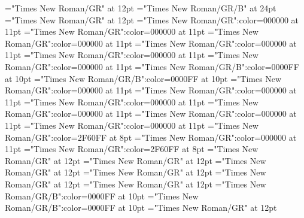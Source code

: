 \documentclass[a4paper]{article}
\begin{document}
\pagestyle{plain}
\sloppy
\setlength{\parfillskip}{0pt plus 1fil}
\font{}="Times New Roman/GR" at 12pt
\font{}="Times New Roman/GR/B" at 24pt
\font{}="Times New Roman/GR" at 12pt
\font\entryletDatadicBody="Times New Roman/GR":color=000000 at 11pt
\font\pictureRightentryletDatadicBody="Times New Roman/GR":color=000000 at 11pt
\font\picturepictureRightentryletDatadicBody="Times New Roman/GR":color=000000 at 11pt
\font\pictureCaptionpictureRightentryletDatadicBody="Times New Roman/GR":color=000000 at 11pt
\font\CmPicturepublishStemCaptionSenseNumberpictureCaptionpictureRightentryletDatadicBody="Times New Roman/GR":color=000000 at 11pt
\font\CmPicturepublishStemCaptionCaptionPubptpictureCaptionpictureRightentryletDatadicBody="Times New Roman/GR":color=000000 at 11pt
\font\headwordsehentryletDatadicBody="Times New Roman/GR/B":color=0000FF at 10pt
\font\headwordafterentryletDatadicBody="Times New Roman/GR/B":color=0000FF at 10pt
\font\sensesentryletDatadicBody="Times New Roman/GR":color=000000 at 11pt
\font\sensesensesentryletDatadicBody="Times New Roman/GR":color=000000 at 11pt
\font\grammaticalinfosensesensesentryletDatadicBody="Times New Roman/GR":color=000000 at 11pt
\font\partofspeechptgrammaticalinfosensesensesentryletDatadicBody="Times New Roman/GR":color=000000 at 11pt
\font{}="Times New Roman/GR":color=000000 at 11pt
\font\xitemptdefinitionLcptsensesensesentryletDatadicBody="Times New Roman/GR":color=000000 at 11pt
\font\xlanguagetagenxitemptdefinitionLcptsensesensesentryletDatadicBody="Times New Roman/GR":color=2F60FF at 8pt
\font\xitemendefinitionLcptsensesensesentryletDatadicBody="Times New Roman/GR":color=000000 at 11pt
\font\xlanguagetagenxitemendefinitionLcptsensesensesentryletDatadicBody="Times New Roman/GR":color=2F60FF at 8pt
\font\entrybletDatadicBody="Times New Roman/GR" at 12pt
\font\pictureRightentrybletDatadicBody="Times New Roman/GR" at 12pt
\font\picturepictureRightentrybletDatadicBody="Times New Roman/GR" at 12pt
\font\pictureCaptionpictureRightentrybletDatadicBody="Times New Roman/GR" at 12pt
\font\CmPicturepublishStemCaptionSenseNumberpictureCaptionpictureRightentrybletDatadicBody="Times New Roman/GR" at 12pt
\font\CmPicturepublishStemCaptionCaptionPubptpictureCaptionpictureRightentrybletDatadicBody="Times New Roman/GR" at 12pt
\font\headwordsehentrybletDatadicBody="Times New Roman/GR/B":color=0000FF at 10pt
\font\headwordafterentrybletDatadicBody="Times New Roman/GR/B":color=0000FF at 10pt
\font\sensesentrybletDatadicBody="Times New Roman/GR" at 12pt
\end{document}
